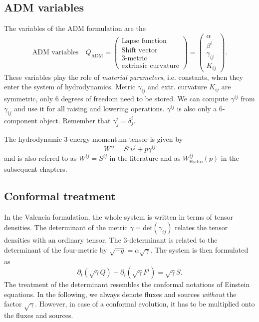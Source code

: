 \documentclass[a4paper]{article}
\newcommand{\desc}[1]{\text{#1}\quad}
\newcommand{\hydro}{\text{Hydro}}
\newcommand{\adm}{\text{ADM}}
\begin{document}
\subsection{ADM variables}
The variables of the ADM formulation are the
\begin{equation}
\desc{ADM variables}
Q_\adm =
\begin{pmatrix}
\text{Lapse function} \\
\text{Shift vector} \\
\text{3-metric} \\
\text{extrinsic curvature}
\end{pmatrix}
=
\begin{pmatrix}
\alpha \\ \beta^i \\ \gamma_{ij} \\ K_{ij}
\end{pmatrix}.
\end{equation}
These variables play the role of \emph{material parameters}, i.e.
constants, when they enter the system of hydrodynamics.
Metric $\gamma_{ij}$ and extr. curvature $K_{ij}$ are symmetric,
only 6 degrees of freedom need to be stored. We can compute
$\gamma^{ij}$ from $\gamma_{ij}$ and use it for all raising and lowering
operations. $\gamma^{ij}$ is also only a 6-component object.
Remember that $\gamma^i_j=\delta^i_j$.

The hydrodynamic 3-energy-momentum-tensor is given by
\begin{equation}\label{eq.grhd.emtensor}
W^{ij} = S^i v^j + p \gamma^{ij}
\end{equation}
and is also refered to as $W^{ij}=S^{ij}$ in the literature and as
$W_\hydro^{ij}(p)$ in the subsequent chapters.

\subsection{Conformal treatment}
In the Valencia formulation, the whole system is written in terms
of tensor densities. The determinant of the metric
$\gamma=\text{det}(\gamma_{ij})$ relates the tensor densities with
an ordinary tensor. The 3-determinant is related to the determinant of
the four-metric by $\sqrt{-g}=\alpha\sqrt{\gamma}$. The system is
then formulated as
\begin{equation}
\partial_t (\sqrt{\gamma} Q)
+ \partial_i (\sqrt{\gamma} F^i) = \sqrt{\gamma} S.
\end{equation}
The treatment of the determinant resembles the conformal notations of
Einstein equations. In the following, we always denote fluxes and
sources \emph{without} the factor $\sqrt{\gamma}$. However, in case of
a conformal evolution, it has to be multiplied onto the fluxes and
sources.
\end{document}
